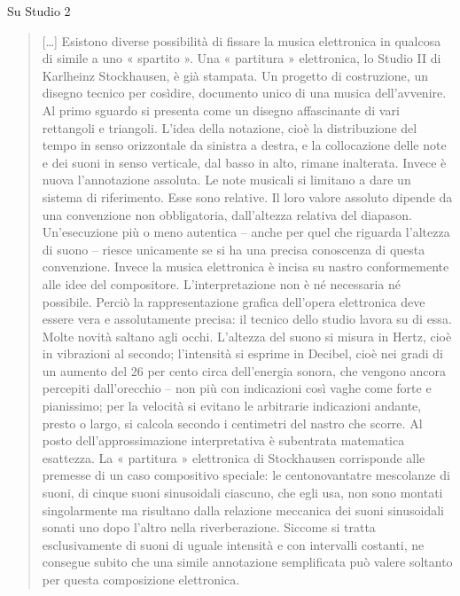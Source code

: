 Su Studio 2

\begin{quote}
[\ldots] Esistono diverse possibilità di fissare la musica elettronica in qualcosa di simile a uno « spartito ». Una « partitura » elettronica, lo Studio II di Karlheinz Stockhausen, è già stampata. Un progetto di costruzione, un disegno tecnico per cosìdire, documento unico di una musica dell’avvenire. Al primo sguardo si presenta come un disegno affascinante di vari rettangoli e triangoli.
L’idea della notazione, cioè la distribuzione del tempo in senso orizzontale da sinistra a destra, e la collocazione delle note e dei suoni in senso verticale, dal basso in alto, rimane inalterata. Invece è nuova l’annotazione assoluta. Le note musicali si limitano a dare un sistema di riferimento. Esse sono relative. Il loro valore assoluto dipende da una convenzione non obbligatoria, dall’altezza relativa del diapason. Un’esecuzione più o meno autentica – anche per quel che riguarda l’altezza di suono – riesce unicamente se si ha una precisa conoscenza di questa convenzione. Invece la musica elettronica è incisa su nastro conformemente alle idee del compositore. L’interpretazione non è né necessaria né possibile. Perciò la rappresentazione grafica dell’opera elettronica deve essere vera e assolutamente precisa: il tecnico dello studio lavora su di essa. Molte novità saltano agli occhi. L’altezza del suono si misura in Hertz, cioè in vibrazioni al secondo; l’intensità si esprime in Decibel, cioè nei gradi di un aumento del 26 per cento circa dell’energia sonora, che vengono ancora percepiti dall’orecchio – non più con indicazioni così vaghe come forte e pianissimo; per la velocità si evitano le arbitrarie indicazioni andante, presto o largo, si calcola secondo i centimetri del nastro che scorre. Al posto dell’approssimazione interpretativa è subentrata matematica esattezza. La « partitura » elettronica di Stockhausen corrisponde alle premesse di un caso compositivo speciale: le centonovantatre mescolanze di suoni, di cinque suoni sinusoidali ciascuno, che egli usa, non sono montati singolarmente ma risultano dalla relazione meccanica dei suoni sinusoidali sonati uno dopo l’altro nella riverberazione. Siccome si tratta esclusivamente di suoni di uguale intensità e con intervalli costanti, ne consegue subito che una simile annotazione semplificata può valere soltanto per questa composizione elettronica.



\end{quote}
